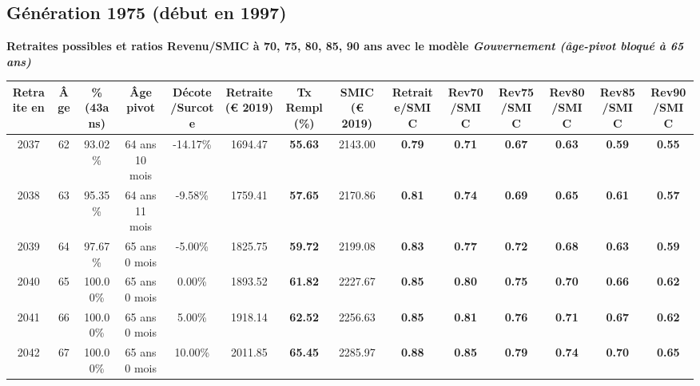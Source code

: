 \subsection{Génération 1975 (début en 1997)} 

{\bf \noindent Retraites possibles et ratios Revenu/SMIC à 70, 75, 80, 85, 90 ans avec le modèle \emph{Gouvernement (âge-pivot bloqué à 65 ans)}}  
 
\begin{adjustbox}{max width=\textwidth} 
\begin{tabular}[htb]{|c|c||c|c|c||c|c||c||c|c|c|c|c|c|} 
\hline 
 Retraite en &  Âge &  \%(43ans) &  Âge pivot &  Décote/Surcote &  Retraite (\euro{} 2019) &  Tx Rempl(\%) &  SMIC (\euro{} 2019) &  Retraite/SMIC &  Rev70/SMIC &  Rev75/SMIC &  Rev80/SMIC &  Rev85/SMIC &  Rev90/SMIC \\ 
\hline \hline 
 2037 &  62 &  93.02\% &  64 ans 10 mois &  -14.17\% &  1694.47 &  {\bf 55.63} &  2143.00 &  {\bf {\color{red} 0.79}} &  {\bf {\color{red} 0.71}} &  {\bf {\color{red} 0.67}} &  {\bf {\color{red} 0.63}} &  {\bf {\color{red} 0.59}} &  {\bf {\color{red} 0.55}} \\ 
\hline 
 2038 &  63 &  95.35\% &  64 ans 11 mois &  -9.58\% &  1759.41 &  {\bf 57.65} &  2170.86 &  {\bf {\color{red} 0.81}} &  {\bf {\color{red} 0.74}} &  {\bf {\color{red} 0.69}} &  {\bf {\color{red} 0.65}} &  {\bf {\color{red} 0.61}} &  {\bf {\color{red} 0.57}} \\ 
\hline 
 2039 &  64 &  97.67\% &  65 ans 0 mois &  -5.00\% &  1825.75 &  {\bf 59.72} &  2199.08 &  {\bf {\color{red} 0.83}} &  {\bf {\color{red} 0.77}} &  {\bf {\color{red} 0.72}} &  {\bf {\color{red} 0.68}} &  {\bf {\color{red} 0.63}} &  {\bf {\color{red} 0.59}} \\ 
\hline 
 2040 &  65 &  100.00\% &  65 ans 0 mois &  0.00\% &  1893.52 &  {\bf 61.82} &  2227.67 &  {\bf {\color{red} 0.85}} &  {\bf {\color{red} 0.80}} &  {\bf {\color{red} 0.75}} &  {\bf {\color{red} 0.70}} &  {\bf {\color{red} 0.66}} &  {\bf {\color{red} 0.62}} \\ 
\hline 
 2041 &  66 &  100.00\% &  65 ans 0 mois &  5.00\% &  1918.14 &  {\bf 62.52} &  2256.63 &  {\bf {\color{red} 0.85}} &  {\bf {\color{red} 0.81}} &  {\bf {\color{red} 0.76}} &  {\bf {\color{red} 0.71}} &  {\bf {\color{red} 0.67}} &  {\bf {\color{red} 0.62}} \\ 
\hline 
 2042 &  67 &  100.00\% &  65 ans 0 mois &  10.00\% &  2011.85 &  {\bf 65.45} &  2285.97 &  {\bf {\color{red} 0.88}} &  {\bf {\color{red} 0.85}} &  {\bf {\color{red} 0.79}} &  {\bf {\color{red} 0.74}} &  {\bf {\color{red} 0.70}} &  {\bf {\color{red} 0.65}} \\ 
\hline 
\hline 
\end{tabular} 
\end{adjustbox} 
 
